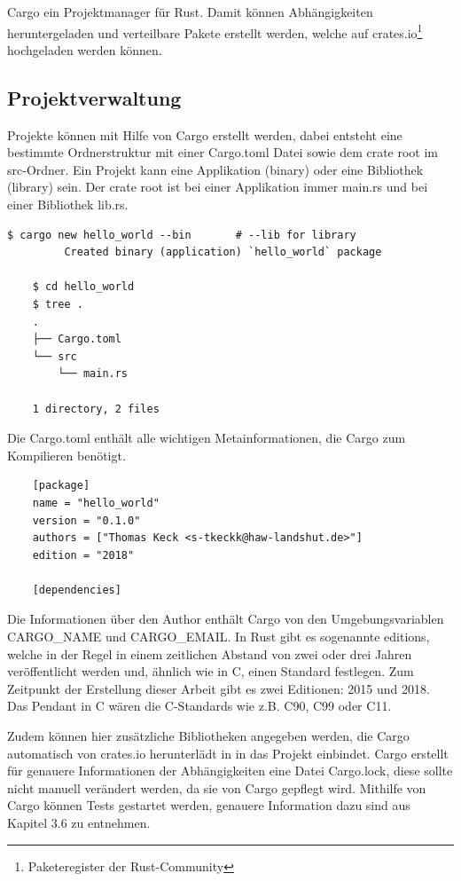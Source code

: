 Cargo ein Projektmanager für Rust. Damit können Abhängigkeiten heruntergeladen und verteilbare Pakete erstellt werden, welche auf crates.io\footnote{Paketeregister der Rust-Community} hochgeladen werden können.

\subsection{Projektverwaltung}

Projekte können mit Hilfe von Cargo erstellt werden, dabei entsteht eine bestimmte Ordnerstruktur mit einer Cargo.toml Datei sowie dem crate root im src-Ordner. Ein Projekt kann eine Applikation (binary) oder eine Bibliothek (library) sein. Der crate root ist bei einer Applikation immer \glqq main.rs\grqq{} und bei einer Bibliothek \glqq lib.rs\grqq{}.

\begin{lstlisting}[style=tree]
    $ cargo new hello_world --bin       # --lib for library
         Created binary (application) `hello_world` package

    $ cd hello_world
    $ tree .
    .
    ├── Cargo.toml
    └── src
        └── main.rs
    
    1 directory, 2 files
\end{lstlisting}

Die Cargo.toml enthält alle wichtigen Metainformationen, die Cargo zum Kompilieren benötigt. 

\begin{lstlisting}
    [package]
    name = "hello_world"
    version = "0.1.0"
    authors = ["Thomas Keck <s-tkeckk@haw-landshut.de>"]
    edition = "2018"
    
    [dependencies]    
\end{lstlisting}

Die Informationen über den Author enthält Cargo von den Umgebungsvariablen CARGO\_NAME und CARGO\_EMAIL. In Rust gibt es sogenannte editions, welche in der Regel in einem zeitlichen Abstand von zwei oder drei Jahren veröffentlicht werden und, ähnlich wie in C, einen Standard festlegen. Zum Zeitpunkt der Erstellung dieser Arbeit gibt es zwei Editionen: 2015 und 2018. Das Pendant in C wären die C-Standards wie z.B. C90, C99 oder C11.

Zudem können hier zusätzliche Bibliotheken angegeben werden, die Cargo automatisch von crates.io herunterlädt in in das Projekt einbindet. Cargo erstellt für genauere Informationen der Abhängigkeiten eine Datei Cargo.lock, diese sollte nicht manuell verändert werden, da sie von Cargo gepflegt wird. Mithilfe von Cargo können Tests gestartet werden, genauere Information dazu sind aus Kapitel 3.6 zu entnehmen.

